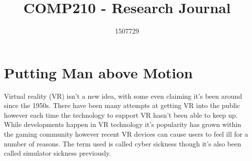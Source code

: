 \documentclass{scrartcl}
\title{COMP210 - Research Journal}
\author{1507729}
\begin{document}
\maketitle

\section{Putting Man above Motion}

Virtual reality (VR) isn't a new idea, with some even claiming it's been around since the 1950s. \cite{vrs2017origin} There have been many attempts at getting VR into the public however each time the technology to support VR hasn't been able to keep up. While developments happen in VR technology it's popularity has grown within the gaming community however recent VR devices can cause users to feel ill for a number of reasons. \cite{porcino2017minimizing} The term used is called cyber sickness though it's also been called simulator sickness \cite{gower1989simulator} previously.
\end{document}
